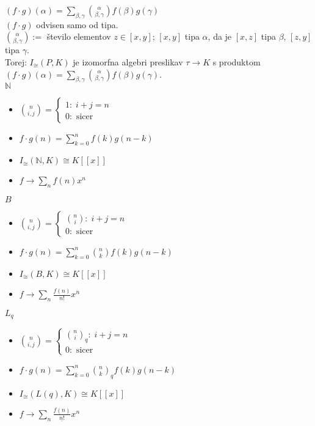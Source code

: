 \documentclass[a4paper, 12pt]{book}
\theoremstyle{definition}
\theoremstyle{remark}
\newcommand{\N}{\mathbb{N}}
\begin{document}
$(f \cdot g)(\alpha) = \sum_{\beta, \gamma} \binom{\alpha}{\beta, \gamma} f(\beta) g(\gamma)$ \\
$(f \cdot g)$ odvisen samo od tipa. \\
$\binom{\alpha}{\beta, \gamma} :=$ število elementov $z \in [x,y]$; $[x,y]$ tipa $\alpha$,
da je $[x,z]$ tipa $\beta$, $[z,y]$ tipa $\gamma$. \\
Torej: $I_{\cong}(P, K)$ je izomorfna algebri preslikav $\tau \to K$ s produktom \\
$(f \cdot g)(\alpha) = \sum_{\beta, \gamma} \binom{\alpha}{\beta, \gamma} f(\beta) g(\gamma)$. \\
$\N$
\begin{itemize}[label={}]
  \item $\binom{n}{i, j} = \begin{cases}
      1: \; i+j=n \\
      0: \text{ sicer}
    \end{cases}$
  \item $f \cdot g(n) = \sum_{k=0}^n f(k) g(n-k)$
  \item $I_{\cong}(\N, K) \cong K[[x]]$
  \item $f \to \sum_n f(n) x^n$
\end{itemize}
$B$
\begin{itemize}[label={}]
  \item $\binom{n}{i, j} = \begin{cases}
      \binom{n}{i}: \; i+j=n \\
      0: \text{ sicer}
    \end{cases}$
  \item $f \cdot g(n) = \sum_{k=0}^n \binom{n}{k} f(k) g(n-k)$
  \item $I_{\cong}(B, K) \cong K[[x]]$
  \item $f \to \sum_n \frac{f(n)}{n!} x^n$
\end{itemize}
$L_q$
\begin{itemize}[label={}]
  \item $\binom{n}{i, j} = \begin{cases}
      \binom{n}{i}_q: \; i+j=n \\
      0: \text{ sicer}
    \end{cases}$
  \item $f \cdot g(n) = \sum_{k=0}^n \binom{n}{k}_q f(k) g(n-k)$
  \item $I_{\cong}(L(q), K) \cong K[[x]]$
  \item $f \to \sum_n \frac{f(n)}{\underline{n!}} x^n$
\end{itemize}
\end{document}
